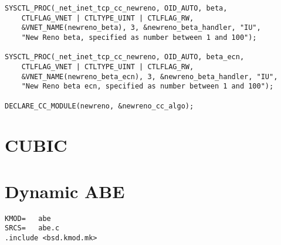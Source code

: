 \begin{code}
\begin{verbatim}
SYSCTL_PROC(_net_inet_tcp_cc_newreno, OID_AUTO, beta,
    CTLFLAG_VNET | CTLTYPE_UINT | CTLFLAG_RW,
    &VNET_NAME(newreno_beta), 3, &newreno_beta_handler, "IU",
    "New Reno beta, specified as number between 1 and 100");

SYSCTL_PROC(_net_inet_tcp_cc_newreno, OID_AUTO, beta_ecn,
    CTLFLAG_VNET | CTLTYPE_UINT | CTLFLAG_RW,
    &VNET_NAME(newreno_beta_ecn), 3, &newreno_beta_handler, "IU",
    "New Reno beta ecn, specified as number between 1 and 100");

DECLARE_CC_MODULE(newreno, &newreno_cc_algo);
\end{verbatim}
\label{code:newreno.c}
\end{code}









\section{CUBIC}










\section{Dynamic ABE}





\begin{code}
\begin{verbatim}
KMOD=	abe
SRCS=	abe.c
.include <bsd.kmod.mk>
\end{verbatim}
\label{code:makefile}
\end{code}